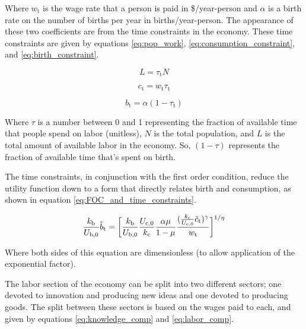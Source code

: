 \documentclass[letterpaper,12pt]{article}
\begin{document}
Where $w_\mathrm{t}$ is the wage rate that a person is paid in \$/year-person and $\alpha$ is a birth rate on the number of births per year in births/year-person. The appearance of these two coefficients are from the time constraints in the economy. These time constraints are given by equations \ref{eq:pop_work}, \ref{eq:consumption_constraint}, and \ref{eq:birth_constraint}.

\begin{equation}\label{eq:pop_work}
	L = \tau_\mathrm{t} N
\end{equation}

\begin{equation} \label{eq:consumption_constraint}
	c_\mathrm{t} = w_\mathrm{t} \tau_\mathrm{t}
\end{equation}

\begin{equation} \label{eq:birth_constraint}
	b_\mathrm{t} = \alpha (1-\tau_\mathrm{t})
\end{equation}

Where $\tau$ is a number between 0 and 1 representing the fraction of available time that people spend on labor (unitless), $N$ is the total population, and $L$ is the total amount of available labor in the economy. So, $(1-\tau)$ represents the fraction of available time that's spent on birth.

The time constraints, in conjunction with the first order condition, reduce the utility function down to a form that directly relates birth and consumption, as shown in equation \ref{eq:FOC_and_time_constraints}.

\begin{equation} \label{eq:FOC_and_time_constraints}
	\frac{k_\mathrm{b}}{U_\mathrm{b,0}} \tilde b_\mathrm{t} = \bigg{[} \frac{k_\mathrm{b}}{U_\mathrm{b,0}} \frac{U_\mathrm{c,0}}{k_\mathrm{c}} \frac{\alpha \mu}{1-\mu} \frac{( \frac{k_\mathrm{c}}{U_\mathrm{c,0}} \tilde c_\mathrm{t} )^\gamma}{w_\mathrm{t}}\bigg{]}^{1/\eta}
\end{equation}

Where both sides of this equation are dimensionless (to allow application of the exponential factor).

The labor section of the economy can be split into two different sectors; one devoted to innovation and producing new ideas and one devoted to producing goods. The split between these sectors is based on the wages paid to each, and given by equations \ref{eq:knowledge_comp} and \ref{eq:labor_comp}.
\end{document}
